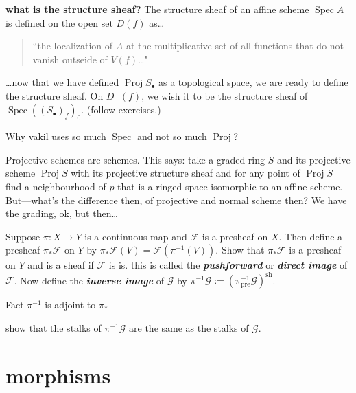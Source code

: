 \textbf{what is the structure sheaf?} The structure sheaf of an affine scheme \(\operatorname{Spec}A\) is defined on the open set \(D(f)\) as…
\begin{quotation}
	``the localization of \(A\) at the multiplicative set of all functions that do not vanish outseide of \(V(f)\)…"
\end{quotation}
…now that we have defined \(\operatorname{Proj}S_\bullet\) as a topological space, we are ready to define the structure sheaf. On \(D_+(f)\), we wish it to be the structure sheaf of \(\operatorname{Spec}((S_{\bullet})_f)_0\). (follow exercises.)

\begin{question}\leavevmode
Why vakil uses so much \(\operatorname{Spec}\) and not so much \(\operatorname{Proj}\)?
\end{question}
\begin{conjecture}\leavevmode
Projective schemes are schemes. This says: take a graded ring \(S\) and its projective scheme \(\operatorname{Proj}S\) with its projective structure sheaf and for any point of \(\operatorname{Proj} S\) find a neighbourhood of \(p\) that is a ringed space isomorphic to an affine scheme. But---what's the difference then, of projective and normal scheme then? We have the grading, ok, but then…
\end{conjecture}

Suppose \(\pi:X \to Y\) is a continuous map and \(\mathcal{F}\) is a presheaf on \(X\). Then define a presheaf \(\pi_*\mathcal{F}\) on \(Y\) by \(\pi_*\mathcal{F}(V)=\mathcal{F}(\pi^{-1}(V))\). Show that \(\pi_*\mathcal{F}\) is a presheaf on \(Y\) and is a sheaf if \(\mathcal{F}\) is is. this is called the \textit{\textbf{pushforward}} or \textit{\textbf{direct image}} of \(\mathcal{F}\). Now define the \textit{\textbf{inverse image}} of \(\mathcal{G}\) by \(\pi^{-1}\mathcal{G}:=(\pi^{-1}_{\operatorname{pre}}\mathcal{G})^{\operatorname{sh}}\).

\begin{thing6}{Fact}\leavevmode
\(\pi^{-1}\) is adjoint to \(\pi_*\)
\end{thing6}

\begin{exercise}\leavevmode
show that the stalks of \(\pi^{-1}\mathcal{G}\) are the same as the stalks of \(\mathcal{G}\).
\end{exercise}

\section{morphisms}

